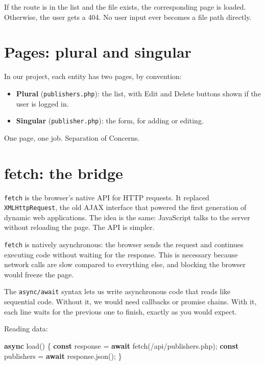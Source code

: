 \documentclass[11pt,a4paper,oneside]{book}
\newenvironment{Shaded}{\begin{snugshade}}{\end{snugshade}}
\newcommand{\KeywordTok}[1]{\textcolor[HTML]{007020}{\textbf{#1}}}
\newcommand{\StringTok}[1]{\textcolor[HTML]{4070A0}{#1}}
\newcommand{\FunctionTok}[1]{\textcolor[HTML]{06287E}{#1}}
\newcommand{\ControlFlowTok}[1]{\textcolor[HTML]{007020}{\textbf{#1}}}
\newcommand{\OperatorTok}[1]{\textcolor[HTML]{666666}{#1}}
\newcommand{\NormalTok}[1]{#1}
\providecommand{\tightlist}{%
  \setlength{\itemsep}{0pt}\setlength{\parskip}{0pt}}
\begin{document}
If the route is in the list and the file exists, the
corresponding page is loaded. Otherwise, the user gets a 404. No
user input ever becomes a file path directly.

\hypertarget{pages-plural-and-singular}{%
\section{Pages: plural and
singular}\label{pages-plural-and-singular}}

In our project, each entity has two pages, by convention:

\begin{itemize}
\tightlist
\item
  \textbf{Plural} (\texttt{publishers.php}): the list, with Edit
  and Delete buttons shown if the user is logged in.
\item
  \textbf{Singular} (\texttt{publisher.php}): the form, for
  adding or editing.
\end{itemize}

One page, one job. Separation of Concerns.

\hypertarget{fetch-the-bridge}{%
\section{fetch: the bridge}\label{fetch-the-bridge}}

\texttt{fetch} is the browser's native API for HTTP requests. It
replaced \texttt{XMLHttpRequest}, the old AJAX interface that
powered the first generation of dynamic web applications. The
idea is the same: JavaScript talks to the server without
reloading the page. The API is simpler.

\texttt{fetch} is natively asynchronous: the browser sends the
request and continues executing code without waiting for the
response. This is necessary because network calls are slow
compared to everything else, and blocking the browser would
freeze the page.

The \texttt{async/await} syntax lets us write asynchronous code
that reads like sequential code. Without it, we would need
callbacks or promise chains. With it, each line waits for the
previous one to finish, exactly as you would expect.

Reading data:

\begin{Shaded}
\begin{Highlighting}[]
\KeywordTok{async} \FunctionTok{load}\NormalTok{() \{}
    \KeywordTok{const}\NormalTok{ response }\OperatorTok{=} \ControlFlowTok{await} \FunctionTok{fetch}\NormalTok{(}\StringTok{\textquotesingle{}/api/publishers.php\textquotesingle{}}\NormalTok{)}\OperatorTok{;}
    \KeywordTok{const}\NormalTok{ publishers }\OperatorTok{=} \ControlFlowTok{await}\NormalTok{ response}\OperatorTok{.}\FunctionTok{json}\NormalTok{()}\OperatorTok{;}
\NormalTok{\}}
\end{Highlighting}
\end{Shaded}
\end{document}
